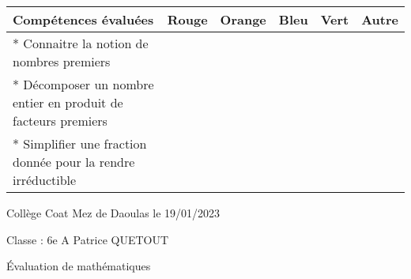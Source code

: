 \documentclass[a4paper,12pt,fleqn]{article}
\begin{document}
\begin{footnotesize}

\begin{center}

\begin{tabular}{|p{120mm}|p{8mm}|p{10mm}|p{8mm}|p{8mm}|p{8mm}|}

\hline
\textbf{Compétences évaluées} & \textbf{Rouge} & \textbf{Orange} & \textbf{Bleu} & \textbf{Vert} & \textbf{Autre} \\
\hline


*  Connaitre la notion de nombres premiers  & & & & & \\ 
\hline
*  Décomposer un nombre entier en produit de facteurs premiers  & & & & & \\ 
\hline
*  Simplifier une fraction donnée pour la rendre irréductible  & & & & & \\ 
\hline
\end{tabular}
\end{center}
\end{footnotesize}
 \par 
\medskip
 \par 
\medskip
 \par 
\medskip
\newpage
\setcounter{exo}{0}


Collège Coat Mez de Daoulas  \hfill  le 19/01/2023

Classe : 6e A \hfill Patrice QUETOUT

\begin{center}
\begin{LARGE} Évaluation de mathématiques \end{LARGE}
\end{center}

\end{document}
